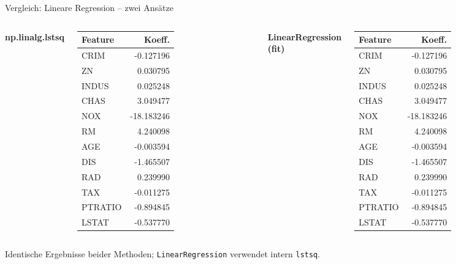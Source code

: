 \begin{frame}{Vergleich: Lineare Regression -- zwei Ansätze}
\medskip
\footnotesize
\begin{columns}
\textbf{np.linalg.lstsq}\\
\medskip
{\scriptsize
\begin{tabular}{lr}
Feature & Koeff. \\
\hline
CRIM & -0.127196\\
ZN & 0.030795\\
INDUS & 0.025248\\
CHAS & 3.049477\\
NOX & -18.183246\\
RM & 4.240098\\
AGE & -0.003594\\
DIS & -1.465507\\
RAD & 0.239990\\
TAX & -0.011275\\
PTRATIO & -0.894845\\
LSTAT & -0.537770\\
\end{tabular}
}

\textbf{LinearRegression (fit)}\\
\medskip
{\scriptsize
\begin{tabular}{lr}
Feature & Koeff. \\
\hline
CRIM & -0.127196\\
ZN & 0.030795\\
INDUS & 0.025248\\
CHAS & 3.049477\\
NOX & -18.183246\\
RM & 4.240098\\
AGE & -0.003594\\
DIS & -1.465507\\
RAD & 0.239990\\
TAX & -0.011275\\
PTRATIO & -0.894845\\
LSTAT & -0.537770\\
\end{tabular}
}

\end{columns}
\medskip
Identische Ergebnisse beider Methoden;  \texttt{LinearRegression} verwendet intern \texttt{lstsq}.

\end{frame}


